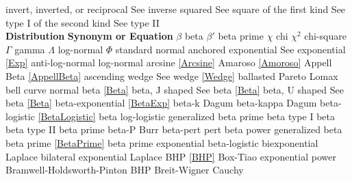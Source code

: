 \noindent
invert, inverted, or reciprocal		\dotfill	See inverse\ncite
squared						\dotfill	See square\ncite
of the first kind					\dotfill	See type I\ncite
of the second kind				\dotfill	See type II\ncite
~\\
\noindent
{\bf Distribution} \hfill {\bf Synonym or Equation}								\ncite
%
$\beta$ 						\dotfill	beta							  	\ncite	%
$\beta'$ 						\dotfill	beta prime						\ncite	%
$\chi$ 						\dotfill	chi								\ncite	%
$\chi^2$ 						\dotfill	chi-square							\ncite 	%
$\Gamma$ 					\dotfill	gamma 							\ncite 	%
$\Lambda$					\dotfill	log-normal 						   	%
$\Phi$						\dotfill	standard normal 					\ncite	%
%
anchored exponential			\dotfill	See exponential \eqref{Exp}			\ncite	%
anti-log-normal 					\dotfill	log-normal 						\ncite	%
arcsine 						\dotfill	\eqref{Arcsine} 					  	\ncite	%
Amaroso						\dotfill	\eqref{Amoroso}					\ncite	%
Appell Beta					\dotfill	\eqref{AppellBeta}					 
ascending wedge				\dotfill	See wedge \eqref{Wedge} 			\ncite	%
%
ballasted Pareto				\dotfill	Lomax							\ncite	%
bell curve 						\dotfill	normal 							\ncite	%
beta 							\dotfill	\eqref{Beta} 						\ncite	%
beta, J shaped					\dotfill	See beta \eqref{Beta} 				\ncite	%
beta, U shaped					\dotfill	See beta \eqref{Beta} 				\ncite	%
beta-exponential				\dotfill	\eqref{BetaExp}						\ncite	%
beta-k						\dotfill	Dagum							%
beta-kappa 					\dotfill	Dagum  							%
beta-logistic					\dotfill	\eqref{BetaLogistic}					\mcite{\self}	%
beta log-logistic					\dotfill	generalized beta prime				\mcite{\self}	%
beta type I 					\dotfill	beta 								\ncite	%
beta type II 					\dotfill	beta prime						\ncite	%
beta-P 						\dotfill	Burr 				 					%
beta-pert						\dotfill	pert 								\ncite	%
beta power					\dotfill	generalized beta					\ncite	%
beta prime 					\dotfill	\eqref{BetaPrime} 					\ncite	%
beta prime exponential			\dotfill	beta-logistic						\mcite{\self} %
biexponential					\dotfill	Laplace							\ncite	%
bilateral exponential  			\dotfill	Laplace 							\ncite	%
BHP							\dotfill	\eqref{BHP}						\ncite	%
Box-Tiao						\dotfill	exponential power					\ncite
Bramwell-Holdsworth-Pinton 		\dotfill	BHP 								\ncite	%
Breit-Wigner  					\dotfill	Cauchy 							\ncite	%
